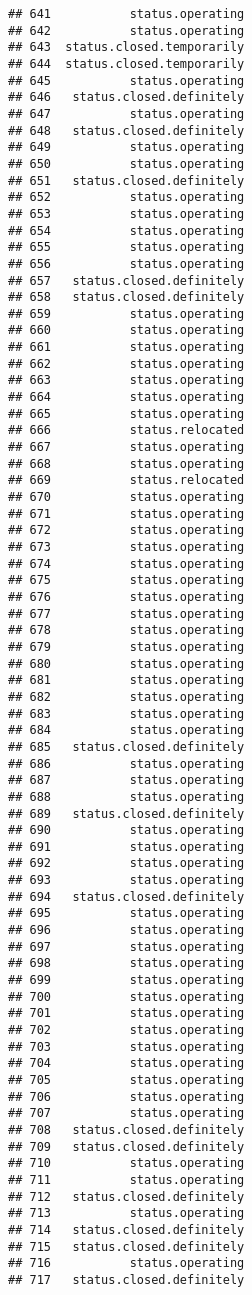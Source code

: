 \documentclass[
]{article}
\begin{document}
\begin{verbatim}
## 641           status.operating
## 642           status.operating
## 643  status.closed.temporarily
## 644  status.closed.temporarily
## 645           status.operating
## 646   status.closed.definitely
## 647           status.operating
## 648   status.closed.definitely
## 649           status.operating
## 650           status.operating
## 651   status.closed.definitely
## 652           status.operating
## 653           status.operating
## 654           status.operating
## 655           status.operating
## 656           status.operating
## 657   status.closed.definitely
## 658   status.closed.definitely
## 659           status.operating
## 660           status.operating
## 661           status.operating
## 662           status.operating
## 663           status.operating
## 664           status.operating
## 665           status.operating
## 666           status.relocated
## 667           status.operating
## 668           status.operating
## 669           status.relocated
## 670           status.operating
## 671           status.operating
## 672           status.operating
## 673           status.operating
## 674           status.operating
## 675           status.operating
## 676           status.operating
## 677           status.operating
## 678           status.operating
## 679           status.operating
## 680           status.operating
## 681           status.operating
## 682           status.operating
## 683           status.operating
## 684           status.operating
## 685   status.closed.definitely
## 686           status.operating
## 687           status.operating
## 688           status.operating
## 689   status.closed.definitely
## 690           status.operating
## 691           status.operating
## 692           status.operating
## 693           status.operating
## 694   status.closed.definitely
## 695           status.operating
## 696           status.operating
## 697           status.operating
## 698           status.operating
## 699           status.operating
## 700           status.operating
## 701           status.operating
## 702           status.operating
## 703           status.operating
## 704           status.operating
## 705           status.operating
## 706           status.operating
## 707           status.operating
## 708   status.closed.definitely
## 709   status.closed.definitely
## 710           status.operating
## 711           status.operating
## 712   status.closed.definitely
## 713           status.operating
## 714   status.closed.definitely
## 715   status.closed.definitely
## 716           status.operating
## 717   status.closed.definitely

\end{verbatim}
\end{document}
